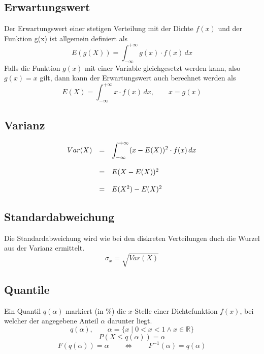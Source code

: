 \subsection{Erwartungswert}
Der Erwartungswert einer stetigen Verteilung mit der Dichte $f(x)$ und 
der Funktion g(x) ist allgemein definiert als
\[ 
	E(g(X)) = \int_{-\infty}^{+\infty} g(x) \cdot f(x)\, dx
\]
Falls die Funktion $g(x)$ mit einer Variable gleichgesetzt werden
kann, also $g(x)=x$ gilt, dann kann der Erwartungswert auch berechnet
werden als
\[  
	E(X) = \int_{-\infty}^{+\infty} x \cdot f(x)\, dx,
		\qquad x = g(x)
\]

\subsection{Varianz}
\[ \begin{array}{l c l} 
	Var(X) 
		& = 
		& \displaystyle 
			\int_{-\infty}^{+\infty} 
			(x-E(X))^2 \cdot f(x)\, dx \\
		& & \\
		& = 
		& E(X-E(X))^2 \\
		& & \\
		& = 
		& E(X^2) - E(X)^2
\end{array} \]

\subsection{Standardabweichung}
Die Standardabweichung wird wie bei den diskreten Verteilungen 
duch die Wurzel aus der Varianz ermittelt.
\[  
	\sigma_x = \sqrt{Var(X)}
\]

\subsection{Quantile}
Ein Quantil $q(\alpha)$ markiert (in \%) die $x$-Stelle einer 
Dichtefunktion $f(x)$, bei welcher der angegebene Anteil $\alpha$
darunter liegt.
\[ 
	q(\alpha), 
		\qquad \alpha = 
		\{x \mid 0 < x < 1 \land x \in \mathbb{R}\}
\]
\[
	P(X \leq q(\alpha)) = \alpha
\]
\[ 
	F(q(\alpha)) = \alpha  
		\qquad \Leftrightarrow \qquad
		F^{-1}(\alpha) = q(\alpha)
\]

